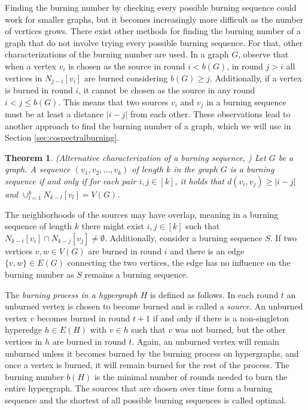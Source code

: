 \documentclass[12pt]{article}
\theoremstyle{plain}
\newtheorem{theorem}{Theorem}[section]
\theoremstyle{definition}
\theoremstyle{remark}
\begin{document}
Finding the burning number by checking every possible burning sequence could work for smaller graphs, but it becomes increasingly more difficult as the number of vertices grows. 
There exist other methods for finding the burning number of a graph that do not involve trying every possible burning sequence.
For that, other characterizations of the burning number are used.
In a graph $G$, observe that when a vertex $v_i$ is chosen as the source in round $i<b(G)$, in round $j>i$ all vertices in $N_{j-i}[v_i]$ are burned considering $b(G)\geq j$. 
Additionally, if a vertex is burned in round $i$, it cannot be chosen as the source in any round $i<j\leq b(G)$. This means that two sources $v_i$ and $v_j$ in a burning sequence must be at least a distance $|i-j|$ from each other.
These observations lead to another approach to find the burning number of a graph, which we will use in Section \ref{sec:cospectralburning}.

\begin{theorem}{(Alternative characterization of a burning sequence, \cite{survey-burning-number})}
    Let $G$ be a graph. A sequence $(v_1,v_2,\dots,v_k)$ of length $k$ in the graph $G$ is a burning sequence if and only if for each pair $i,j\in[k]$, it holds that $d(v_i,v_j)\geq |i-j|$ and
    $\cup_{l=1}^k N_{k-l}[v_l] = V(G)$.
    \label{thm:alternative burning}
\end{theorem}

The neighborhoods of the sources may have overlap, meaning in a burning sequence of length $k$ there might exist $i,j\in [k]$ such that $N_{k-i}[v_i] \cap N_{k-j}[v_j]\neq \emptyset$.
Additionally, consider a burning sequence $S$. If two vertices $v,w\in V(G)$ are burned in round $i$ and there is an edge $\{v,w\}\in E(G)$ connecting the two vertices, the edge has no influence on the burning number as $S$ remains a burning sequence.







The \textit{burning process in a hypergraph} $H$ is defined as follows. 
In each round $t$ an unburned vertex is chosen to become burned and is called a \textit{source}.
An unburned vertex $v$ becomes burned in round $t+1$ if and only if there is a non-singleton hyperedge $h\in E(H)$ with $v\in h$ such that $v$ was not burned, but the other vertices in $h$ are burned in round $t$.
Again, an unburned vertex will remain unburned unless it becomes burned by the burning process on hypergraphs, and once a vertex is burned, it will remain burned for the rest of the process.
The burning number $b(H)$ is the minimal number of rounds needed to burn the entire hypergraph.
The sources that are chosen over time form a burning sequence and the shortest of all possible burning sequences is called optimal.
\end{document}
